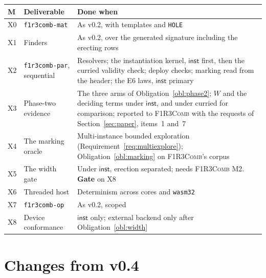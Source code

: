 \documentclass[11pt,a4paper]{article}
\newcommand{\code}[1]{\texttt{#1}}
\newcommand{\Comb}{\textsc{F1R3Comb}}
\theoremstyle{definition}
\theoremstyle{plain}
\newcommand{\inst}{\mathsf{inst}}
\begin{document}
\begin{center}
\begin{tabularx}{\linewidth}{@{}ll>{\raggedright\arraybackslash}X@{}}
\toprule
M & Deliverable & Done when\\
\midrule
X0 & \code{f1r3comb-mat} & As v0.2, with templates and \code{HOLE}\\
X1 & Finders & As v0.2, over the generated signature including the erecting
rows\\
X2 & \code{f1r3comb-par}, sequential & Resolvers; the instantiation kernel,
$\inst$ first, then the curried validity check; deploy checks; marking read
from the header; the E6 laws, $\inst$ primary\\
X3 & Phase-two evidence & The three arms of Obligation~\ref{obl:phase2}; $W$
and the deciding terms under $\inst$, and under curried for comparison;
reported to \Comb{} with the requests of Section~\ref{sec:paper}, items~1 and~7\\
X4 & The marking oracle & Multi-instance bounded exploration
(Requirement~\ref{req:multiexplore}); Obligation~\ref{obl:marking} on
\Comb's corpus\\
X5 & The width gate & Under $\inst$, erection separated; needs \Comb{} M2.
\textbf{Gate} on X8\\
X6 & Threaded host & Determinism across cores and \code{wasm32}\\
X7 & \code{f1r3comb-op} & As v0.2, scoped\\
X8 & Device conformance & $\inst$ only; external backend only after
Obligation~\ref{obl:width}\\
\bottomrule
\end{tabularx}
\end{center}

\section{Changes from v0.4}\label{sec:v4delta}
\end{document}
